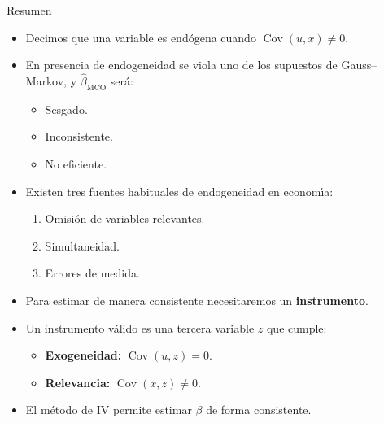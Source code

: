 \documentclass[10pt]{beamer}
\begin{document}
\begin{frame}{Resumen}
    \begin{itemize}
        \item Decimos que una variable es end\'ogena cuando $\operatorname{Cov}(u,x) \neq 0$.
        \item En presencia de endogeneidad se viola uno de los supuestos de Gauss--Markov, y $\hat{\beta}_{\text{MCO}}$ ser\'a:
        \begin{itemize}
            \item Sesgado.
            \item Inconsistente.
            \item No eficiente.
        \end{itemize}
        \item Existen tres fuentes habituales de endogeneidad en econom\'\i a:
        \begin{enumerate}
            \item Omisi\'on de variables relevantes.
            \item Simultaneidad.
            \item Errores de medida.
        \end{enumerate}
        \item Para estimar de manera consistente necesitaremos un \textbf{instrumento}.
        \item Un instrumento v\'alido es una tercera variable $z$ que cumple:
        \begin{itemize}
            \item \textbf{Exogeneidad:} $\operatorname{Cov}(u,z)=0$.
            \item \textbf{Relevancia:} $\operatorname{Cov}(x,z) \neq 0$.
        \end{itemize}
        \item El m\'etodo de IV permite estimar $\beta$ de forma consistente.
    \end{itemize}
\end{frame}
\end{document}
